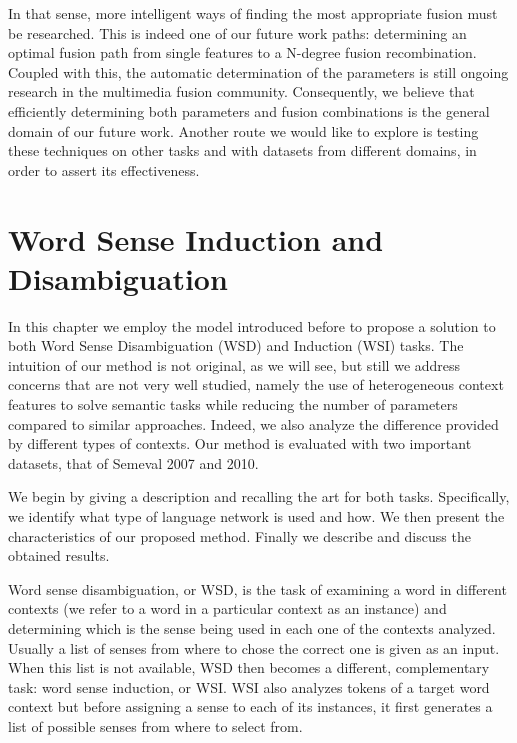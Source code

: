 In that sense, more intelligent ways of finding the most appropriate fusion must be researched. This is indeed one of our future work paths: determining an optimal fusion path from single features to a N-degree fusion recombination. Coupled with this, the automatic determination of the parameters is still ongoing research in the multimedia fusion community. Consequently, we believe that efficiently determining both parameters and fusion combinations is the general domain of our future work. Another route we would like to explore is testing these techniques on other tasks and with datasets from different domains, in order to assert its effectiveness.


\section{Word Sense Induction and Disambiguation}

In this chapter we employ the model introduced before to propose a solution to both Word Sense Disambiguation (WSD) and Induction  (WSI) tasks. The intuition of our method is not original, as we will see, but still we address concerns that are not very well studied, namely the use of heterogeneous context features to solve semantic tasks while reducing the number of parameters compared to similar approaches. Indeed, we also analyze the difference provided by different types of contexts. Our method is evaluated with two important datasets, that of Semeval 2007 and 2010.

We begin by giving a description and  recalling the art for both tasks. Specifically, we identify what type of language network is used and how.
We then present the characteristics of our proposed method. Finally we describe and discuss the obtained results.



Word sense disambiguation, or WSD, is the task of examining a word in different contexts (we refer to a word in a particular context as an instance)  and determining which is the sense being used in each one of the contexts analyzed. Usually a list of senses from where to chose the correct one is given as an input. When this list is not available, WSD then becomes a different, complementary task: word sense induction, or WSI. WSI also analyzes  tokens of a target word context but before assigning a sense to each of its instances, it first generates a list of possible senses from where to select from. 

